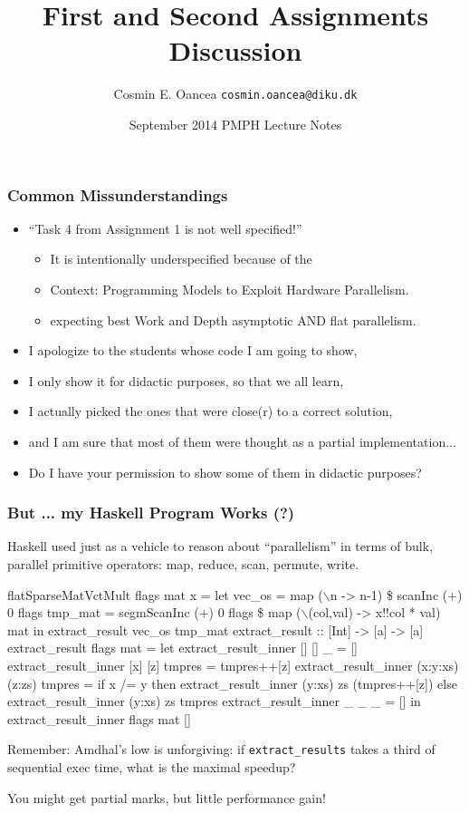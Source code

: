 \documentclass{beamer}
\title[Assignments]{First and Second Assignments Discussion}
\author[C.~Oancea]{Cosmin E. Oancea {\tt cosmin.oancea@diku.dk}}
\institute{Department of Computer Science (DIKU)\\University of Copenhagen}
\date[Sept 2014]{September 2014 PMPH Lecture Notes}
\renewcommand{\emph}[1]{\textcolor{structure}{#1}}
\newcommand{\emp}[1]{\textcolor{DikuRed}{ #1}}
\newcommand{\mymath}[1]{$ #1 $}
\begin{document}
\titleslide

\begin{frame}[fragile,t]
\frametitle{Common Missunderstandings}

\begin{itemize}
    \item ``Task 4 from Assignment 1 is not well specified!''\\\pause
        \begin{itemize}
            \item It is intentionally underspecified because of the
            \item Context: Programming Models to Exploit Hardware Parallelism. 
            \item expecting \emp{best Work and Depth asymptotic AND flat parallelism.}  
        \end  {itemize}\medskip
    \item I apologize to the students whose code I am going to show,
    \item I only show it for didactic purposes, so that we all learn,
    \item I actually picked the ones that were close(r) to a correct solution,
    \item and I am sure that most of them were thought as a partial implementation...\medskip

    \item \alert{Do I have your permission to show some of them in didactic purposes?}

\end  {itemize}
\end{frame}

\begin{frame}[fragile,t]
\frametitle{But ... my Haskell Program Works (?)}

Haskell used just as a vehicle to reason about ``parallelism''
in terms of bulk, parallel primitive operators: 
map, reduce, scan, permute, write.\medskip

\begin{colorcode}[fontsize=\scriptsize]
 flatSparseMatVctMult flags mat x = 
    let vec_os  = \emph{map (\mymath{\backslash}n -> n-1) \$ scanInc (+) 0 flags}
        tmp_mat = \emph{segmScanInc (+) 0 flags \$ map (\mymath{\backslash}(col,val) -> x!!col * val) mat}
    in \alert{extract_result vec_os tmp_mat}
extract_result :: [Int] -> [a] -> [a]
extract_result flags mat = let 
    extract_result_inner [] [] _ = []
    extract_result_inner [x] [z] tmpres = tmpres++[z]
    extract_result_inner (x:y:xs) (z:zs) tmpres = 
        if x /= y
        then extract_result_inner (y:xs) zs (tmpres++[z])
        else extract_result_inner (y:xs) zs tmpres
    extract_result_inner _ _ _ = []
  in extract_result_inner flags mat []
\end{colorcode}
\pause

\alert{Remember: Amdhal's low is unforgiving}: if  
{\tt extract\_results} takes a third of sequential 
exec time, what is the maximal speedup?
\medskip

You might get partial marks, but little performance gain!


\end{frame}
\end{document}
